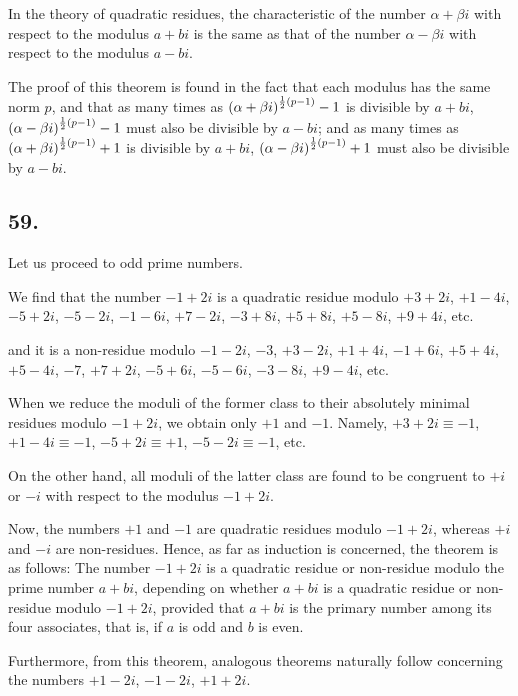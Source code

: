 \documentclass[twoside,12pt]{memoir}
\let\oldfrac\frac
\def\frac#1#2{\mathchoice{\tfrac{#1}{#2}}{\oldfrac{#1}{#2}}{\genfrac{}{}{}{2}{#1}{#2\mathstrut}}{\genfrac{}{}{}{3}{#1}{#2\mathstrut}}}
\begin{document}
In the theory of quadratic residues, the characteristic of the number \(\alpha+\beta i\) with respect to the modulus \(a+b i\) is the same as that of the number \(\alpha-\beta i\) with respect to the modulus \(a-b i\).

The proof of this theorem is found in the fact that each modulus has the same norm \(p\), and that as many times as \((\alpha+\beta i)^{\frac{1}{2}(p-1)}-1\) is divisible by \(a+b i\), \((\alpha-\beta i)^{\frac{1}{2}(p-1)}-1\) must also be divisible by \(a-b i\); and as many times as \((\alpha+\beta i)^{\frac{1}{2}(p-1)}+1\) is divisible by \(a+b i\), \((\alpha-\beta i)^{\frac{1}{2}(p-1)}+1\) must also be divisible by \(a-b i\).

\subsection*{59.}
Let us proceed to odd prime numbers.

We find that the number \(-1+2 i\) is a quadratic residue modulo \(+3+2 i\), \(+1-4 i\), \(-5+2 i\), \(-5-2 i\), \(-1-6 i\), \(+7-2 i\), \(-3+8 i\), \(+5+8 i\), \(+5-8 i\), \(+9+4 i\), etc{.}

and it is a non-residue modulo \(-1-2 i\), \(-3\), \(+3-2 i\), \(+1+4 i\), \(-1+6 i\), \(+5+4 i\), \(+5-4 i\), \(-7\), \(+7+2 i\), \(-5+6 i\), \(-5-6 i\), \(-3-8 i\), \(+9-4 i\), etc{.}

When we reduce the moduli of the former class to their absolutely minimal residues modulo \(-1+2 i\), we obtain only \(+1\) and \(-1\). Namely, \(+3+2 i \equiv -1\), \(+1-4 i \equiv -1\), \(-5+2 i \equiv +1\), \(-5-2 i \equiv -1\), etc{.}

On the other hand, all moduli of the latter class are found to be congruent to \(+i\) or \(-i\) with respect to the modulus \(-1+2 i\).

Now, the numbers \(+1\) and \(-1\) are quadratic residues modulo \(-1+2 i\), whereas \(+i\) and \(-i\) are non-residues. Hence, as far as induction is concerned, the theorem is as follows: The number \(-1+2 i\) is a quadratic residue or non-residue modulo the prime number \(a+b i\), depending on whether \(a+bi\) is a quadratic residue or non-residue modulo \(-1+2 i\), provided that \(a+b i\) is the primary number among its four associates, that is, if \(a\) is odd and \(b\) is even.

Furthermore, from this theorem, analogous theorems naturally follow concerning the numbers \(+1-2 i\), \(-1-2 i\), \(+1+2 i\).
\end{document}
